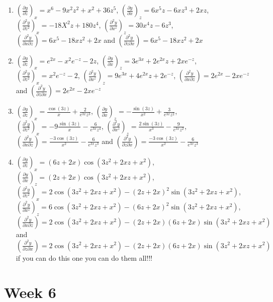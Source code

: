 \documentclass[
]{book}
\begin{document}
\begin{enumerate}
\def\labelenumi{\arabic{enumi}.}
\item
  \(\left(\frac{\partial y}{\partial z}\right)_x= x^6-9x^2z^2+x^2+36z^5\),
  \(\left(\frac{\partial y}{\partial x}\right)_z=6x^5z-6xz^3+2xz\),
  \(\left(\frac{\partial^2 y}{\partial z^2}\right)_x=-18X^2z+180z^4\),
  \(\left(\frac{\partial^2 y}{\partial x^z}\right)_z=30x^4z-6z^3\),
  \(\left(\frac{\partial^2 y}{\partial x \partial z}\right)=6x^5-18xz^2+2x\) and
  \(\left(\frac{\partial^2 y}{\partial z \partial x}\right)=6x^5-18xz^2+2x\)
\item
  \(\left(\frac{\partial y}{\partial z}\right)_x=e^{2x}-x^2e^{-z}-2z\),
  \(\left(\frac{\partial y}{\partial x}\right)_z=3e^{3x}+2e^{2x}z+2xe^{-z}\),
  \(\left(\frac{\partial^2 y}{\partial z^2}\right)_x=x^2e^{-z}-2\),
  \(\left(\frac{\partial^2 y}{\partial x^z}\right)_z=9e^{3x}+4e^{2x}z+ 2e^{-z}\),
  \(\left(\frac{\partial^2 y}{\partial x \partial z}\right)=2e^{2x}-2xe^{-z}\) and
  \(\left(\frac{\partial^2 y}{\partial z \partial x}\right)=2e^{2x}-2xe^{-z}\)
\item
  \(\left(\frac{\partial y}{\partial z}\right)_x=\frac{\cos (3z)}{x}+\frac{2}{e^{3x}z^3}\),
  \(\left(\frac{\partial y}{\partial x}\right)_z=-\frac{\sin (3z)}{x^2}+\frac{3}{e^{3x}z^2}\),
  \(\left(\frac{\partial^2 y}{\partial z^2}\right)_x=-9\frac{\sin (3z)}{x}-\frac{6}{e^{3x}z^4}\),
  \(\left(\frac{\partial^2 y}{\partial x^z}\right)_z=\frac{2\sin (3z)}{x^3}-\frac{9}{e^{3x}z^2}\),
  \(\left(\frac{\partial^2 y}{\partial x \partial z}\right)=\frac{-3\cos (3z)}{x^2}-\frac{6}{e^{3x}z^3}\) and
  \(\left(\frac{\partial^2 y}{\partial z \partial x}\right)=\frac{-3\cos (3z)}{x^2}-\frac{6}{e^{3x}z^3}\)
\item
  \(\left(\frac{\partial y}{\partial z}\right)_x=(6z+2x)\cos(3z^2+2xz+x^2)\),
  \(\left(\frac{\partial y}{\partial x}\right)_z=(2z+2x)\cos(3z^2+2xz+x^2)\),
  \(\left(\frac{\partial^2 y}{\partial z^2}\right)_x=2\cos(3z^2+2xz+x^2)-(2z+2x)^2\sin(3z^2+2xz+x^2)\),
  \(\left(\frac{\partial^2 y}{\partial x^z}\right)_z=6\cos(3z^2+2xz+x^2)-(6z+2x)^2\sin(3z^2+2xz+x^2)\),
  \(\left(\frac{\partial^2 y}{\partial x \partial z}\right)=2\cos(3z^2+2xz+x^2)-(2z+2x)(6z+2x)\sin(3z^2+2xz+x^2)\) and
  \(\left(\frac{\partial^2 y}{\partial z \partial x}\right)=2\cos(3z^2+2xz+x^2)-(2z+2x)(6z+2x)\sin(3z^2+2xz+x^2)\) if you can do this one you can do them all!!!
\end{enumerate}

\hypertarget{ch:Workshop6}{%
\chapter{Week 6}\label{ch:Workshop6}}
\end{document}
